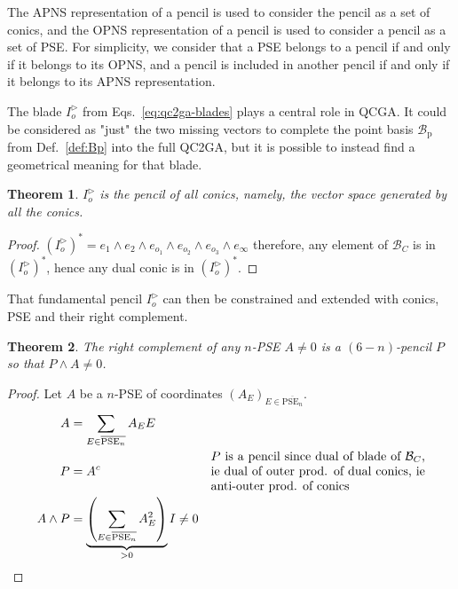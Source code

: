 \documentclass{birkjour}
\newtheorem{theorem}{Theorem}
\begin{document}
\noindent The APNS representation of a pencil is used to consider the pencil as a set of conics, and the OPNS representation of a pencil is used to consider a pencil as a set of PSE.
For simplicity, we consider that a PSE belongs to a pencil if and only if it belongs to its OPNS, and a pencil is included in another pencil if and only if it belongs to its APNS representation.

The blade \(I_o^\triangleright\) from Eqs.~\eqref{eq:qc2ga-blades} plays a central role in QCGA. It could be considered as "just" the two missing vectors to complete the point basis \(\mathcal{B}_\mathrm{p}\) from Def.~\eqref{def:Bp} into the full QC2GA, but it is possible to instead find a geometrical meaning for that blade.

\begin{theorem}
\(I_o^\triangleright\) is the pencil of all conics, namely, the vector space generated by all the conics.
\end{theorem}
\begin{proof}
\((I_o^\triangleright)^* = e_1\wedge e_2 \wedge e_{o_1} \wedge e_{o_2} \wedge e_{o_3} \wedge e_{\infty}\) therefore, any element of \(\mathcal{B}_C\) is in \((I_o^\triangleright)^*\), hence any dual conic is in \((I_o^\triangleright)^*\).
\end{proof}
That fundamental pencil \(I^\triangleright_o\) can then be constrained and extended with conics, PSE and their right complement.


\begin{theorem}\label{th:complement-n-PSE} 
The right complement of any \(n\)-PSE \(A \neq 0 \) is a \((6-n)\)-pencil \(P\) so that \(P \wedge A \ne 0\).
\end{theorem}
\begin{proof}
Let \(A\) be a \(n\)-PSE of coordinates \(\left(A_E\right)_{E\in \overline{\mathrm{PSE}_n}}\).
\begin{align*}
A &= \sum_{E\in \overline{\mathrm{PSE}_n}} A_E E \\
P &= A^c & \parbox{0.5\linewidth}{\(P\) is a pencil since dual of blade of \(\mathcal{B}_C\), ie dual of outer prod. of dual conics, ie anti-outer prod. of conics} \\
A\wedge P  &= \underbrace{\left(\sum_{E\in \overline{\mathrm{PSE}_n}} A_E^2\right)}_{> 0} I \ne 0
\end{align*}
\end{proof}
\end{document}
